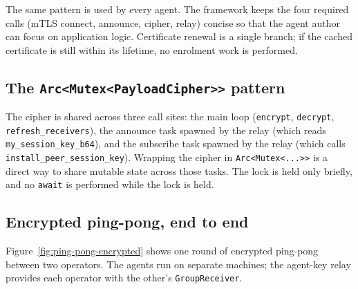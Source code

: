\documentclass[11pt,a4paper]{article}
\begin{document}
The same pattern is used by every agent. The framework keeps the
four required calls (mTLS connect, announce, cipher, relay)
concise so that the agent author can focus on application logic.
Certificate renewal is a single branch; if the cached certificate
is still within its lifetime, no enrolment work is performed.

\subsection{The \texttt{Arc<Mutex<PayloadCipher>>} pattern}

The cipher is shared across three call sites: the main loop
(\texttt{encrypt}, \texttt{decrypt}, \texttt{refresh\_receivers}),
the announce task spawned by the relay (which reads
\texttt{my\_session\_key\_b64}), and the subscribe task spawned by
the relay (which calls \texttt{install\_peer\_session\_key}).
Wrapping the cipher in \texttt{Arc<Mutex<...>>} is a direct way
to share mutable state across those tasks. The lock is held only
briefly, and no \texttt{await} is performed while the lock is
held.

\subsection{Encrypted ping-pong, end to end}

Figure~\ref{fig:ping-pong-encrypted} shows one round of encrypted
ping-pong between two operators. The agents run on separate
machines; the agent-key relay provides each operator with the
other's \texttt{GroupReceiver}.
\end{document}
